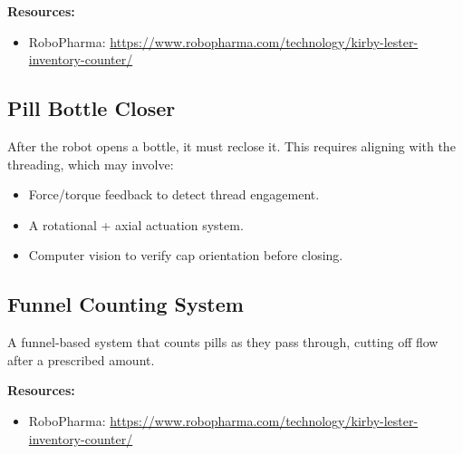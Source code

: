 \documentclass[11pt]{article}
\begin{document}
\textbf{Resources:}
\begin{itemize}[nosep]
    \item RoboPharma: \url{https://www.robopharma.com/technology/kirby-lester-inventory-counter/}
\end{itemize}

\subsection{Pill Bottle Closer}
After the robot opens a bottle, it must reclose it. This requires aligning with the threading, which may involve:
\begin{itemize}[nosep]
    \item Force/torque feedback to detect thread engagement.
    \item A rotational + axial actuation system.
    \item Computer vision to verify cap orientation before closing.
\end{itemize}

\subsection{Funnel Counting System}
A funnel-based system that counts pills as they pass through, cutting off flow after a prescribed amount.

\textbf{Resources:}
\begin{itemize}[nosep]
    \item RoboPharma: \url{https://www.robopharma.com/technology/kirby-lester-inventory-counter/}
\end{itemize}
\end{document}
